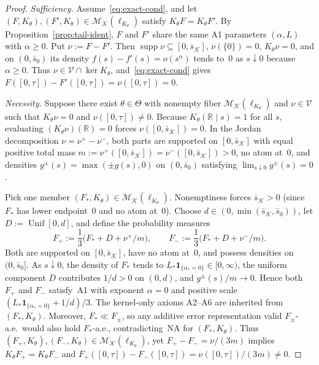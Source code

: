 \documentclass[11pt]{article}
\theoremstyle{plain}
\theoremstyle{definition}
\theoremstyle{remark}
\DeclareMathOperator{\supp}{supp}
\DeclareMathOperator{\Unif}{Unif}
\begin{document}
\begin{proof}
\emph{Sufficiency.} Assume~\eqref{eq:exact-cond}, and let $(F, K_\theta), (F', K_\theta) \in \mathcal{M}_{\mathcal{K}}(\ell_{K_\theta})$ satisfy $K_\theta F = K_\theta F'$.
By Proposition~\ref{prop:tail-ident}, $F$ and $F'$ share the same A1 parameters $(\alpha, L)$ with $\alpha \ge 0$.
Put $\nu := F - F'$. Then $\supp \nu \subseteq [0, \bar s_{\mathcal{K}}]$, $\nu(\{0\}) = 0$, $K_\theta \nu = 0$, and on $(0, \bar s_0)$ its density $f(s) - f'(s) = o(s^\alpha)$ tends to~$0$ as $s \downarrow 0$ because $\alpha \ge 0$.
Thus $\nu \in \mathcal{V} \cap \ker K_\theta$, and~\eqref{eq:exact-cond} gives $F([0, \tau]) - F'([0, \tau]) = \nu([0, \tau]) = 0$.

\emph{Necessity.} Suppose there exist $\theta \in \Theta$ with nonempty fiber $\mathcal{M}_{\mathcal{K}}(\ell_{K_\theta})$ and $\nu \in \mathcal{V}$ such that $K_\theta \nu = 0$ and $\nu([0, \tau]) \neq 0$.
Because $K_\theta(\mathbb{R} \mid s) = 1$ for all $s$, evaluating $(K_\theta \nu)(\mathbb{R}) = 0$ forces $\nu([0, \bar s_{\mathcal{K}}]) = 0$.
In the Jordan decomposition $\nu = \nu^+ - \nu^-$, both parts are supported on $[0, \bar s_{\mathcal{K}}]$ with equal positive total mass $m := \nu^+([0, \bar s_{\mathcal{K}}]) = \nu^-([0, \bar s_{\mathcal{K}}]) > 0$, no atom at~$0$, and densities $g^\pm(s) = \max(\pm g(s), 0)$ on $(0, \bar s_0)$ satisfying $\lim_{s \downarrow 0} g^\pm(s) = 0$.

Pick one member $(F_*, K_\theta) \in \mathcal{M}_{\mathcal{K}}(\ell_{K_\theta})$. Nonemptiness forces $\bar s_{\mathcal{K}} > 0$ (since $F_*$ has lower endpoint~$0$ and no atom at~$0$). Choose $d \in (0, \min(\bar s_{\mathcal{K}}, \bar s_0))$, let $D := \Unif[0, d]$, and define the probability measures
\[
F_+ := \frac{1}{3}\bigl(F_* + D + \nu^+/m\bigr), \qquad
F_- := \frac{1}{3}\bigl(F_* + D + \nu^-/m\bigr).
\]
Both are supported on $[0, \bar s_{\mathcal{K}}]$, have no atom at~$0$, and possess densities on $(0, \bar s_0]$.
As $s \downarrow 0$, the density of $F_*$ tends to $L_* \mathbf{1}_{\{\alpha_* = 0\}} \in [0, \infty)$, the uniform component $D$ contributes $1/d > 0$ on $(0, d)$, and $g^\pm(s)/m \to 0$.
Hence both $F_+$ and $F_-$ satisfy~A1 with exponent $\alpha = 0$ and positive scale $(L_* \mathbf{1}_{\{\alpha_* = 0\}} + 1/d)/3$.
The kernel-only axioms A2--A6 are inherited from $(F_*, K_\theta)$.
Moreover, $F_* \ll F_\pm$, so any additive error representation valid $F_\pm$-a.e.\ would also hold $F_*$-a.e., contradicting~NA for $(F_*, K_\theta)$.
Thus $(F_+, K_\theta), (F_-, K_\theta) \in \mathcal{M}_{\mathcal{K}}(\ell_{K_\theta})$, yet $F_+ - F_- = \nu/(3m)$ implies $K_\theta F_+ = K_\theta F_-$ and $F_+([0, \tau]) - F_-([0, \tau]) = \nu([0, \tau])/(3m) \neq 0$.
\end{proof}
\end{document}

